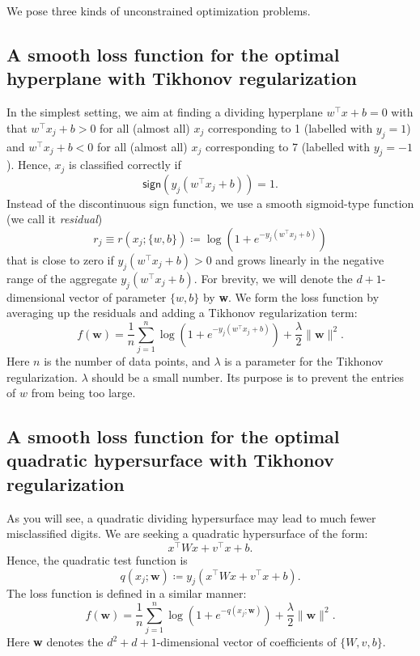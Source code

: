 \documentclass{../kin_math}
\begin{document}
We pose three kinds of unconstrained optimization problems.
\subsection{A smooth loss function for the optimal hyperplane with Tikhonov regularization}
In the simplest setting, we aim at finding a dividing hyperplane $w^\top x + b = 0$ with that $w^\top x_j + b > 0$ for all (almost all) $x_j$ corresponding to 1 (labelled with $y_j = 1$) and $w^\top x_j + b < 0$ for all (almost all) $x_j$ corresponding to 7 (labelled with $y_j = -1$). Hence, $x_j$ is classified
correctly if
\begin{equation*}
  \textsf{sign}(y_j(w^\top x_j + b)) = 1.
\end{equation*}
Instead of the discontinuous \textsf{sign} function, we use a smooth sigmoid-type function (we call it \emph{residual})
\begin{equation}
  r_j \equiv r(x_j; \{w, b\}) \coloneqq \log\left(1 + e^{-y_j(w^\top x_j + b)}\right)
\end{equation}
that is close to zero if $y_j(w^\top x_j + b) > 0$ and grows linearly in the negative range of the aggregate $y_j(w^\top x_j + b)$. For brevity, we will denote the $d + 1$-dimensional vector of parameter $\{w, b\}$ by \textbf{w}. We form the loss function by averaging up the residuals and adding a Tikhonov regularization term:
\begin{equation}
  f(\textbf{w}) = \frac{1}{n} \sum_{j = 1}^n \log\left(1 + e^{-y_j(w^\top x_j + b)}\right) + \frac{\lambda}{2} \lVert \textbf{w} \rVert^2.
\end{equation}
Here $n$ is the number of data points, and $\lambda$ is a parameter for the Tikhonov regularization. $\lambda$ should be a small number. Its purpose is to prevent the entries of $w$ from being too large.
\subsection{A smooth loss function for the optimal quadratic hypersurface with Tikhonov regularization}
As you will see, a quadratic dividing hypersurface may lead to much fewer misclassified digits. We are seeking a quadratic hypersurface of the form:
\begin{equation*}
  x^\top W x + v^\top x + b.
\end{equation*}
Hence, the quadratic test function is
\begin{equation}
  q(x_j; \textbf{w}) \coloneqq y_j(x^\top W x + v^\top x + b).
\end{equation}
The loss function is defined in a similar manner:
\begin{equation}
  \label{eq:loss}
  f(\textbf{w}) = \frac{1}{n} \sum_{j = 1}^n \log\left(1 + e^{-q(x_j; \textbf{w})}\right) + \frac{\lambda}{2} \lVert \textbf{w} \rVert^2.
\end{equation}
Here \textbf{w} denotes the $d^2 + d + 1$-dimensional vector of coefficients of $\{W, v, b\}$.
\end{document}
